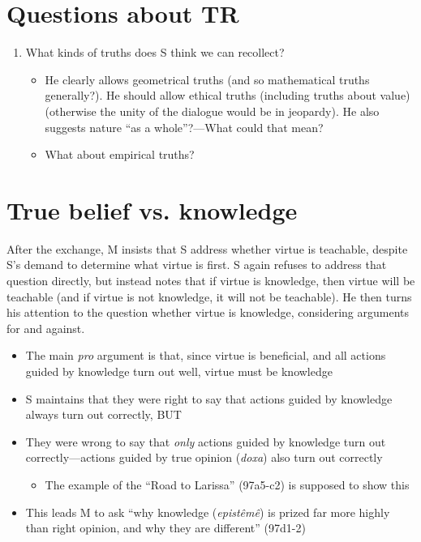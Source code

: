 \documentclass[10 pt]{article}
\begin{document}
\begin{description}
\section*{Questions about TR}
\begin{enumerate}
\item What kinds of truths does S think we can recollect?
\begin{itemize}\item{He clearly allows geometrical truths (and so mathematical truths generally?). He should allow ethical truths (including truths about value) (otherwise the unity of the dialogue would be in jeopardy). He also suggests nature ``as a whole''?---What could that mean?}\item{What about empirical truths?}\end{itemize}
\end{enumerate}


\section*{True belief vs. knowledge}

After the exchange, M insists that S address whether virtue is teachable, despite S's demand to determine what virtue is first. S again refuses to address that question directly, but instead notes that if virtue is knowledge, then virtue will be teachable (and if virtue is not knowledge, it will not be teachable). He then turns his attention to the question whether virtue is knowledge, considering arguments for and against.
\begin{itemize}\item{The main \emph{pro} argument is that, since virtue is beneficial, and all actions guided by knowledge turn out well, virtue must be knowledge}
\item S maintains that they were right to say that actions guided by knowledge always turn out correctly, BUT
\item They were wrong to say that \emph{only} actions guided by knowledge turn out correctly---actions guided by true opinion (\emph{doxa}) also turn out correctly

\begin{itemize}\item{The example of the ``Road to Larissa'' (97a5-c2) is supposed to show this}\end{itemize}

\item This leads M to ask ``why knowledge (\emph{epist\^{e}m\^{e}}) is prized far more highly than right opinion, and why they are different'' (97d1-2)


\end{itemize}
\end{description}
\end{document}
